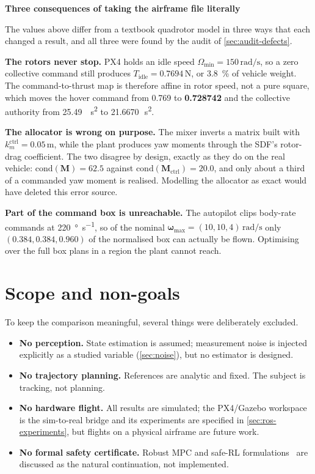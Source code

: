 \documentclass[11pt,a4paper,twoside,openright]{report}
\newcommand{\vUhover}{0.728742}          %
\newcommand{\vTidle}{0.7694}             %
\newcommand{\vOmMin}{150}                %
\newcommand{\vDadc}{21.6670}             %
\newcommand{\vCondPlant}{62.5}           %
\newcommand{\vCondCtrl}{20.0}            %
\newcommand{\vKmCtrl}{0.05}              %
\renewcommand{\vec}[1]{\bm{#1}}
\newcommand{\mat}[1]{\bm{#1}}
\newcommand{\bodyrate}{\vec{\omega}}
\theoremstyle{plain}
\theoremstyle{definition}
\theoremstyle{remark}
\newcommand{\keyhead}[1]{\textbf{\sffamily\small\textcolor{NavyDeep}{#1}}\par\vspace{2pt}}
\begin{document}
	\begin{keybox}
		\keyhead{Three consequences of taking the airframe file literally}
		The values above differ from a textbook quadrotor model in three ways that each
		changed a result, and all three were found by the audit of
		\cref{sec:audit-defects}.

		\textbf{The rotors never stop.} PX4 holds an idle speed
		$\Omega_{\min}=\vOmMin\,\si{\radian\per\second}$, so a zero collective command
		still produces $T_\mathrm{idle}=\vTidle\,\si{\newton}$, or \SI{3.8}{\percent} of
		vehicle weight. The command-to-thrust map is therefore affine in rotor speed,
		not a pure square, which moves the hover command from \num{0.769} to
		\textbf{\vUhover} and the collective authority from
		\SI{25.49}{\per\square\second} to \vDadc\,\si{\per\square\second}.

		\textbf{The allocator is wrong on purpose.} The mixer inverts a matrix built
		with $k_m^\mathrm{ctrl}=\vKmCtrl\,\si{\metre}$, while the plant produces yaw
		moments through the SDF's rotor-drag coefficient. The two disagree by design,
		exactly as they do on the real vehicle: $\mathrm{cond}(\mat M)=\vCondPlant$
		against $\mathrm{cond}(\mat M_\mathrm{ctrl})=\vCondCtrl$, and only about a
		third of a commanded yaw moment is realised. Modelling the allocator as exact
		would have deleted this error source.

		\textbf{Part of the command box is unreachable.} The autopilot clips body-rate
		commands at \SI{220}{\degree\per\second}, so of the nominal
		$\bodyrate_{\max}=(10,10,4)\,\si{\radian\per\second}$ only
		$(0.384,0.384,0.960)$ of the normalised box can actually be flown. Optimising
		over the full box plans in a region the plant cannot reach.
	\end{keybox}

	\section{Scope and non-goals}

	To keep the comparison meaningful, several things were deliberately excluded.

	\begin{itemize}[leftmargin=*]
		\item \textbf{No perception.} State estimation is assumed; measurement noise is
		injected explicitly as a studied variable (\cref{sec:noise}), but no
		estimator is designed.
		\item \textbf{No trajectory planning.} References are analytic and fixed. The
		subject is tracking, not planning.
		\item \textbf{No hardware flight.} All results are simulated; the PX4/Gazebo
		workspace is the sim-to-real bridge and its experiments are specified in
		\cref{sec:ros-experiments}, but flights on a physical airframe are future
		work.
		\item \textbf{No formal safety certificate.} Robust MPC and safe-RL
		formulations~\cite{zanon2021safe,berkenkamp2017safe} are discussed as the
		natural continuation, not implemented.
	\end{itemize}
\end{document}
